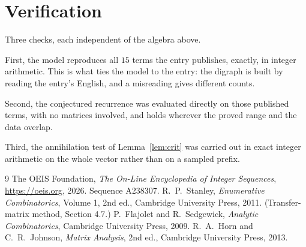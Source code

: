 \documentclass[11pt,a4paper]{article}
\theoremstyle{plain}
\theoremstyle{definition}
\begin{document}
\section{Verification}

Three checks, each independent of the algebra above.

First, the model reproduces all $15$ terms the entry publishes, exactly, in integer
arithmetic. This is what ties the model to the entry: the digraph is built by reading the
entry's English, and a misreading gives different counts.

Second, the conjectured recurrence was evaluated directly on those published terms, with no
matrices involved, and holds wherever the proved range and the data overlap.

Third, the annihilation test of Lemma~\ref{lem:crit} was carried out in exact integer
arithmetic on the whole vector rather than on a sampled prefix.

\begin{thebibliography}{9}
 The OEIS Foundation, \emph{The On-Line Encyclopedia of Integer
Sequences}, \url{https://oeis.org}, 2026. Sequence A238307.
 R.~P.~Stanley, \emph{Enumerative Combinatorics}, Volume 1, 2nd ed.,
Cambridge University Press, 2011. (Transfer-matrix method, Section 4.7.)
 P.~Flajolet and R.~Sedgewick, \emph{Analytic Combinatorics}, Cambridge
University Press, 2009.
 R.~A.~Horn and C.~R.~Johnson, \emph{Matrix Analysis}, 2nd ed., Cambridge
University Press, 2013.
\end{thebibliography}
\end{document}
